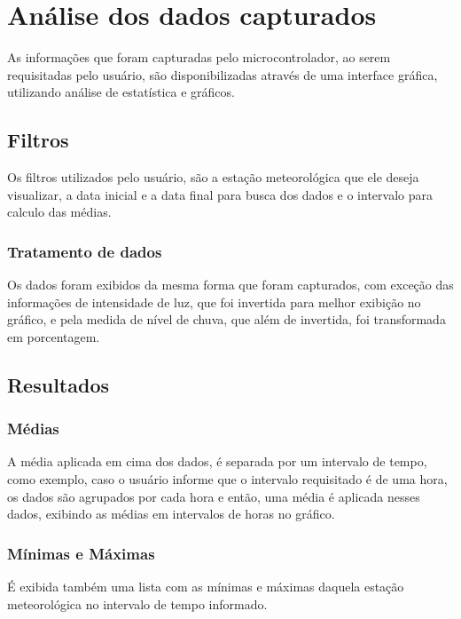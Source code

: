 \chapter{Análise dos dados capturados}

As informações que foram capturadas pelo microcontrolador, ao serem requisitadas pelo usuário, são disponibilizadas através de uma interface gráfica, utilizando análise de estatística e gráficos.

\section{Filtros}

Os filtros utilizados pelo usuário, são a estação meteorológica que ele deseja visualizar, a data inicial e a data final para busca dos dados e o intervalo para calculo das médias.

\subsection{Tratamento de dados}

Os dados foram exibidos da mesma forma que foram capturados, com exceção das informações de intensidade de luz, que foi invertida para melhor exibição no gráfico, e pela medida de nível de chuva, que além de invertida, foi transformada em porcentagem.

\section{Resultados}

\subsection{Médias}

A média aplicada em cima dos dados, é separada por um intervalo de tempo, como exemplo, caso o usuário informe que o intervalo requisitado é de uma hora, os dados são agrupados por cada hora e então, uma média é aplicada nesses dados, exibindo as médias em intervalos de horas no gráfico.

\subsection{Mínimas e Máximas}

É exibida também uma lista com as mínimas e máximas daquela estação meteorológica no intervalo de tempo informado.